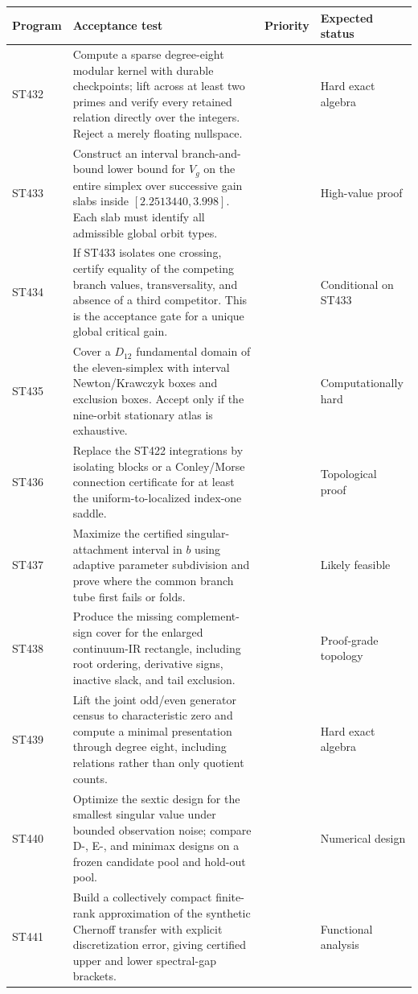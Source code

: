 \documentclass[11pt,a4paper]{article}
\begin{document}
\begin{longtable}{>{\raggedright\arraybackslash}p{}>{\raggedright\arraybackslash}p{}>{\raggedright\arraybackslash}p{}>{\raggedright\arraybackslash}p{}}
\toprule Program&Acceptance test&Priority&Expected status\\\midrule\endhead
ST432&Compute a sparse degree-eight modular kernel with durable checkpoints; lift across at least two primes and verify every retained relation directly over the integers.  Reject a merely floating nullspace.&1&Hard exact algebra\\
ST433&Construct an interval branch-and-bound lower bound for $V_g$ on the entire simplex over successive gain slabs inside $[2.2513440,3.998]$.  Each slab must identify all admissible global orbit types.&1&High-value proof\\
ST434&If ST433 isolates one crossing, certify equality of the competing branch values, transversality, and absence of a third competitor.  This is the acceptance gate for a unique global critical gain.&1&Conditional on ST433\\
ST435&Cover a $D_{12}$ fundamental domain of the eleven-simplex with interval Newton/Krawczyk boxes and exclusion boxes.  Accept only if the nine-orbit stationary atlas is exhaustive.&1&Computationally hard\\
ST436&Replace the ST422 integrations by isolating blocks or a Conley/Morse connection certificate for at least the uniform-to-localized index-one saddle.&2&Topological proof\\
ST437&Maximize the certified singular-attachment interval in $b$ using adaptive parameter subdivision and prove where the common branch tube first fails or folds.&2&Likely feasible\\
ST438&Produce the missing complement-sign cover for the enlarged continuum-IR rectangle, including root ordering, derivative signs, inactive slack, and tail exclusion.&2&Proof-grade topology\\
ST439&Lift the joint odd/even generator census to characteristic zero and compute a minimal presentation through degree eight, including relations rather than only quotient counts.&2&Hard exact algebra\\
ST440&Optimize the sextic design for the smallest singular value under bounded observation noise; compare D-, E-, and minimax designs on a frozen candidate pool and hold-out pool.&3&Numerical design\\
ST441&Build a collectively compact finite-rank approximation of the synthetic Chernoff transfer with explicit discretization error, giving certified upper and lower spectral-gap brackets.&2&Functional analysis\\

\end{longtable}
\end{document}
